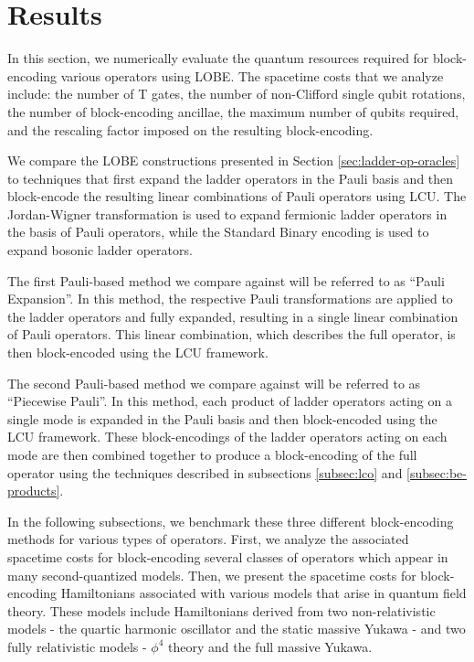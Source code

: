 \section{Results}
\label{sec:results}

In this section, we numerically evaluate the quantum resources required for block-encoding various operators using LOBE.
The spacetime costs that we analyze include: the number of T gates, the number of non-Clifford single qubit rotations, the number of block-encoding ancillae, the maximum number of qubits required, and the rescaling factor imposed on the resulting block-encoding.

We compare the LOBE constructions presented in Section \ref{sec:ladder-op-oracles} to techniques that first expand the ladder operators in the Pauli basis and then block-encode the resulting linear combinations of Pauli operators using LCU.
The Jordan-Wigner transformation \cite{jordan-wigner} is used to expand fermionic ladder operators in the basis of Pauli operators, while the Standard Binary encoding \cite{standard-binary} is used to expand bosonic ladder operators.

The first Pauli-based method we compare against will be referred to as ``Pauli Expansion''.
In this method, the respective Pauli transformations are applied to the ladder operators and fully expanded, resulting in a single linear combination of Pauli operators.
This linear combination, which describes the full operator, is then block-encoded using the LCU framework.

The second Pauli-based method we compare against will be referred to as ``Piecewise Pauli''.
In this method, each product of ladder operators acting on a single mode is expanded in the Pauli basis and then block-encoded using the LCU framework.
These block-encodings of the ladder operators acting on each mode are then combined together to produce a block-encoding of the full operator using the techniques described in subsections \ref{subsec:lco} and \ref{subsec:be-products}.

In the following subsections, we benchmark these three different block-encoding methods for various types of operators.
First, we analyze the associated spacetime costs for block-encoding several classes of operators which appear in many second-quantized models.
Then, we present the spacetime costs for block-encoding Hamiltonians associated with various models that arise in quantum field theory.
These models include Hamiltonians derived from two non-relativistic models - the quartic harmonic oscillator and the static massive Yukawa - and two fully relativistic models - $\phi^4$ theory and the full massive Yukawa.

